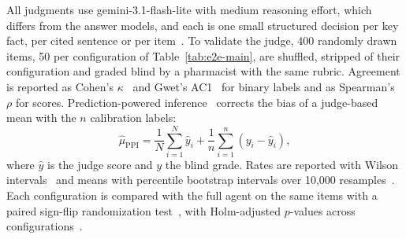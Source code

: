 All judgments use gemini-3.1-flash-lite with medium reasoning effort, which differs from the answer models, and each is one small structured decision per key fact, per cited sentence or per item~\cite{zheng2023judge}. To validate the judge, 400 randomly drawn items, 50 per configuration of Table~\ref{tab:e2e-main}, are shuffled, stripped of their configuration and graded blind by a pharmacist with the same rubric. Agreement is reported as Cohen's $\kappa$~\cite{cohen1960kappa} and Gwet's AC1~\cite{gwet2008ac1} for binary labels and as Spearman's $\rho$ for scores. Prediction-powered inference~\cite{angelopoulos2023ppi,saadfalcon2024ares} corrects the bias of a judge-based mean with the $n$ calibration labels:
\begin{equation}\label{eq:ppi}
\hat\mu_{\mathrm{PPI}}=\frac{1}{N}\sum_{i=1}^{N}\hat{y}_i+\frac{1}{n}\sum_{i=1}^{n}\left(y_i-\hat{y}_i\right),
\end{equation}
\noindent where $\hat{y}$ is the judge score and $y$ the blind grade. Rates are reported with Wilson intervals~\cite{wilson1927} and means with percentile bootstrap intervals over 10{,}000 resamples~\cite{efron1993bootstrap}. Each configuration is compared with the full agent on the same items with a paired sign-flip randomization test~\cite{smucker2007significance}, with Holm-adjusted $p$-values across configurations~\cite{holm1979}.
